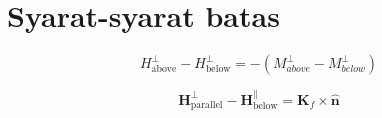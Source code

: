 \documentclass[10pt,english,twocolumn,fleqn]{extarticle}
\begin{document}
\section{Syarat-syarat batas}
\begin{equation}
H^{\bot}_{\mathrm{above}} - H^{\bot}_{\mathrm{below}} = -\left( M^{\bot}_{above}
- M^{\bot}_{below} \right)
\end{equation}

\begin{equation}
\mathbf{H}^{\bot}_{\mathrm{parallel}} - \mathbf{H}^{\parallel}_{\mathrm{below}} =
\mathbf{K}_f \times \hat{\mathbf{n}}
\end{equation}
\end{document}
